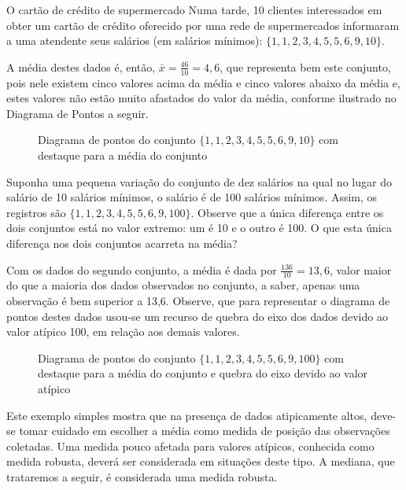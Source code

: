 \begin{example}{O cartão de crédito de supermercado}
Numa tarde, 10 clientes interessados em obter um cartão de crédito oferecido por uma rede de supermercados informaram a uma atendente seus salários (em salários mínimos): \(\{1, 1, 2, 3, 4, 5, 5, 6, 9, 10\}\).

A média destes dados é, então, \(\bar{x}=\frac{46}{10}=4,6\), que representa bem este conjunto, pois nele existem cinco valores acima da média e cinco valores abaixo da média e, estes valores não estão muito afastados do valor da média, conforme ilustrado no Diagrama de Pontos a seguir.

\begin{figure}[H]
\centering
\capstart

\noindent{}
\caption{Diagrama de pontos do conjunto \(\{1, 1, 2, 3, 4, 5, 5, 6, 9, 10\}\) com destaque para a média do conjunto}\label{\detokenize{PE104-1:fig-diagramadepontos-media-sem-outlier}}\label{\detokenize{PE104-1:id12}}\end{figure}

Suponha uma pequena variação do conjunto de dez salários na qual no lugar do salário de 10 salários mínimos, o salário é de 100 salários mínimos. Assim, os registros são \(\{1, 1, 2, 3, 4, 5, 5, 6, 9, 100\}\).  Observe que a única diferença entre os dois conjuntos está no valor extremo: um é 10 e o outro é 100. O que esta única diferença nos dois conjuntos acarreta na média?

Com os dados do segundo conjunto, a média é dada por \(\frac{136}{10}=13,6\), valor maior do que a maioria dos dados observados no conjunto, a saber, apenas uma observação é bem superior a 13,6. Observe, que para representar o diagrama de pontos destes dados usou-se um recurso de quebra do eixo dos dados devido ao valor atípico 100, em relação aos demais valores.

\begin{figure}[H]
\centering
\capstart

\noindent{}
\caption{Diagrama de pontos do conjunto \(\{1, 1, 2, 3, 4, 5, 5, 6, 9, 100\}\) com destaque para a média do conjunto e quebra do eixo devido ao valor atípico}\label{\detokenize{PE104-1:fig-diagramadepontos-media-com-outlier}}\label{\detokenize{PE104-1:id13}}\end{figure}

Este exemplo simples mostra que na presença de dados atipicamente altos, deve-se tomar cuidado em escolher a média como medida de posição das observações coletadas. Uma medida pouco afetada para valores atípicos, conhecida como medida robusta,  deverá ser considerada em situações deste tipo. A mediana, que trataremos a seguir, é considerada uma medida robusta.

\end{example}

